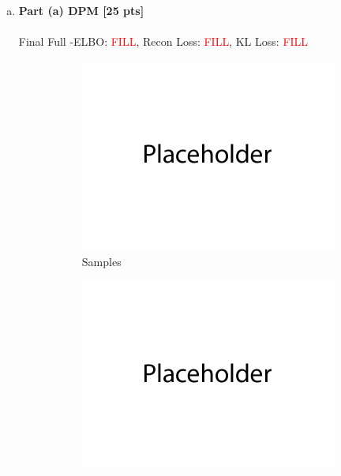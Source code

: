 \documentclass{article}
\begin{document}

\begin{enumerate}[(a)]
\item {\bf Part (a) DPM [25 pts]} \\\\
Final Full -ELBO: \textcolor{red}{FILL}, Recon Loss: \textcolor{red}{FILL}, KL Loss: \textcolor{red}{FILL}
\begin{figure}[H]
         \centering
         \begin{subfigure}[b]{0.475\textwidth}
             \centering
             \includegraphics[width=\textwidth]{figures/q3_a_samples.png}
             \caption{Samples}
         \end{subfigure}
         \hfill
         \begin{subfigure}[b]{0.475\textwidth}
             \centering
             \includegraphics[width=\textwidth]{figures/q3_a_train_plot.png}

\end{subfigure}
\end{figure}
\end{enumerate}
\end{document}
